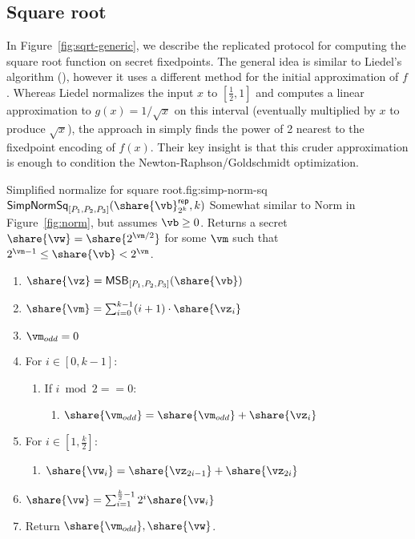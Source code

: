 \subsection{Square root}
\label{subsec:sqrt}

In Figure~\ref{fig:sqrt-generic}, we describe the replicated protocol for computing
the square root function on secret fixedpoints. The general idea is similar to
Liedel's algorithm (\cite{Liedel2012SecureDC}), however it uses a different method
for the initial approximation of $f$. Whereas Liedel normalizes the input $x$ to
$[\frac{1}{2}, 1]$ and computes a linear approximation to $g(x) = 1 / \sqrt{x}$ on
this interval (eventually multiplied by $x$ to produce $\sqrt{x}$), the approach in
\cite{cryptoeprint:2019:354} simply finds the power of 2 nearest to the fixedpoint
encoding of $f(x)$. Their key insight is that this cruder approximation is enough
to condition the Newton-Raphson/Goldschmidt optimization.

\begin{Boxfig}{Simplified normalize for square root.}{fig:simp-norm-sq}
  {$\mathsf{SimpNormSq}_{[P_1, P_2, P_3]}(\share{\vb}^\mathsf{rep}_{2^k}, k)$}
  Somewhat similar to Norm in Figure~\ref{fig:norm}, but assumes $\vb \geq 0$.
  Returns a secret $\share{\vw} = \share{2^{\vm/2}}$ for some $\vm$ such that
  $2^{\vm-1} \leq \share{\vb} < 2^\vm$.
  \begin{enumerate}
    \item $\share{\vz} = \mathsf{MSB}_{[P_1, P_2, P_3]} ( \share{\vb})$
    \item $\share{\vm} = \sum_{i=0}^{k-1}(i+1)\cdot\share{\vz_i}$
    \item $\vm_{odd} = 0$
    \item For $i \in [0, k-1]$:
    \begin{enumerate}
      \item If $i \bmod 2 == 0$:
      \begin{enumerate}
        \item $\share{\vm_{odd}} = \share{\vm_{odd}} + \share{\vz_i}$
      \end{enumerate}
    \end{enumerate}
    \item For $i \in [1, \frac{k}{2}]$:
    \begin{enumerate}
      \item $\share{\vw_i} = \share{\vz_{2i-1}} + \share{\vz_{2i}}$
    \end{enumerate}
    \item $\share{\vw} = \sum_{i=1}^{\frac{k}{2} - 1}2^i\share{\vw_i}$
    \item Return $\share{\vm_{odd}},\share{\vw}$.
  \end{enumerate}
\end{Boxfig}

